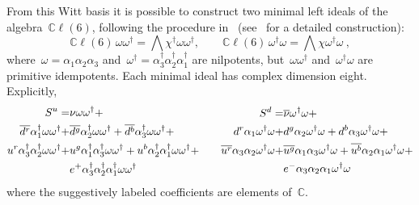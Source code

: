 \documentclass[reqno,11pt]{amsart}
\numberwithin{equation}{section}
\newcommand{\1}{\mbox{\rm 1 \hspace{-1.05 em} 1}}
\newcommand{\bb}[1]{\mathbb{#1}}
\begin{document}
From this Witt basis it is possible to construct two minimal left ideals of the algebra~$\bb{C}\ell(6)$, following the procedure in~\cite{ablamowicz1995construction} (see~\cite{furey2016standard} for a detailed construction):
\[ \bb{C}\ell(6)\,\omega\omega^{\dagger}=\bigwedge\chi^{\dagger}\omega\omega^{\dagger},\qquad \bb{C}\ell(6)\,\omega^{\dagger}\omega=\bigwedge\chi\omega^{\dagger}\omega \:, \]
where~$\omega = \alpha_1\alpha_2\alpha_3$ and~$\omega^\dagger = \alpha_3^\dagger\alpha_2^\dagger\alpha_1^\dagger$ are nilpotents, but~$\omega\omega^{\dagger}$ and~$\omega^{\dagger}\omega$ are primitive idempotents. Each minimal ideal has complex dimension eight. Explicitly,
\begin{equation} \notag
 \begin{split}
     S^u=&{\nu}\omega\omega^\dagger + \\  \overline{d^r}{\alpha_1^\dagger}\omega\omega^\dagger + &\overline{d^g}{\alpha_2^\dagger}\omega\omega^\dagger + \overline{d^b}{\alpha_3^\dagger}\omega\omega^\dagger + \\ u^r{\alpha_3^\dagger}{\alpha_2^\dagger}\omega\omega^\dagger + &u^g{\alpha_1^\dagger}{\alpha_3^\dagger}\omega\omega^\dagger + u^b{\alpha_2^\dagger}{\alpha_1^\dagger}\omega\omega^\dagger + \\ &e^+{\alpha_3^\dagger}{\alpha_2^\dagger}{\alpha_1^\dagger}\omega\omega^\dagger
\end{split}
\qquad 
\begin{split}
     S^d=&{\overline{\nu}}\omega^\dagger\omega + \\ {d}^r{\alpha_1}\omega^\dagger\omega + &{d}^g{\alpha_2}\omega^\dagger\omega +  {d}^b{\alpha_3}\omega^\dagger\omega + \\ \overline{u^r}{\alpha_3}{\alpha_2}\omega^\dagger\omega + &\overline{u^g}{\alpha_1}{\alpha_3}\omega^\dagger\omega + \overline{u^b}{\alpha_2}{\alpha_1}\omega^\dagger\omega + \\ &e^-{\alpha_3}{\alpha_2}{\alpha_1}\omega^\dagger\omega
\end{split}
\end{equation}
where the suggestively labeled coefficients are elements of~$\bb{C}$. 
\end{document}
